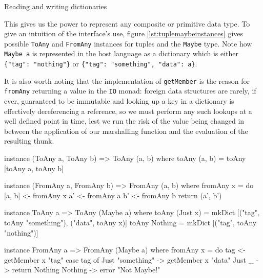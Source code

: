 \documentclass{sigplanconf}
\begin{document}
\begin{listingfloat}
\caption{Reading and writing dictionaries}
\label{lst:dicts}
\end{listingfloat}

This gives us the power to represent any composite or primitive data
type. To give an intuition of the interface's use, figure
\ref{lst:tuplemaybeinstances} gives possible \lstinline!ToAny! and
\lstinline!FromAny! instances for tuples and the \lstinline!Maybe! type.
Note how \lstinline!Maybe a! is represented in the host language as a
dictionary which is either {\tt \{"tag": "nothing"\}} or
{\tt \{"tag": "something", "data": a\}}.

It is also worth noting that the implementation of \lstinline!getMember! is
the reason for \lstinline!fromAny! returning a value in the \lstinline!IO!
monad: foreign data structures are rarely, if ever, guaranteed to be immutable
and looking up a key in a dictionary is effectively dereferencing a reference,
so we must perform any such lookups at a well defined point in time,
lest we run the risk of the value being changed in between the application
of our marshalling function and the evaluation of the resulting thunk.

\begin{listingfloat}
\begin{code}
  instance (ToAny a, ToAny b) => ToAny (a, b) where
    toAny (a, b) = toAny [toAny a, toAny b]

  instance (FromAny a, FromAny b) => FromAny (a, b) where
    fromAny x = do
      [a, b] <- fromAny x
      a' <- fromAny a
      b' <- fromAny b
      return (a', b')

  instance ToAny a => ToAny (Maybe a) where
    toAny (Just x) =
      mkDict [("tag",  toAny "something"),
              ("data", toAny x)]
    toAny Nothing =
      mkDict [("tag",  toAny "nothing")]

  instance FromAny a => FromAny (Maybe a) where
    fromAny x = do
      tag <- getMember x "tag"
      case tag of
        Just "something" -> getMember x "data"
        Just _           -> return Nothing
        Nothing          -> error "Not Maybe!"
\end{code}
\caption{Possible instances for tuples and \lstinline!Maybe!}
\label{lst:tuplemaybeinstances}
\end{listingfloat}
\end{document}
